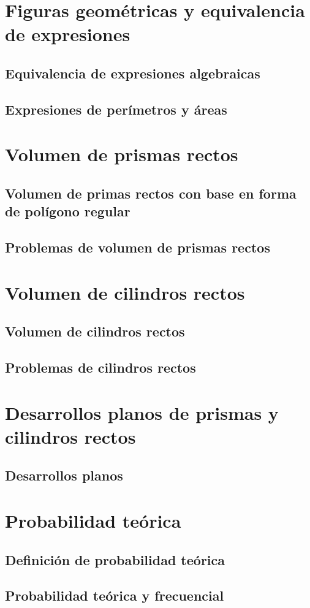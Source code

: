 \documentclass[11pt]{book}
\begin{document}
\section{Figuras geométricas y equivalencia de expresiones}
\subsection{Equivalencia de expresiones algebraicas}
\subsection{Expresiones de perímetros y áreas}

\section{Volumen de prismas rectos}
\subsection{Volumen de primas rectos con base en forma de polígono regular}
\subsection{Problemas de volumen de prismas rectos}

\section{Volumen de cilindros rectos}
\subsection{Volumen de cilindros rectos}
\subsection{Problemas de cilindros rectos}

\section{Desarrollos planos de prismas y cilindros rectos}
\subsection{Desarrollos planos}

\section{Probabilidad teórica}
\subsection{Definición de probabilidad teórica}
\subsection{Probabilidad teórica y frecuencial}
\end{document}
